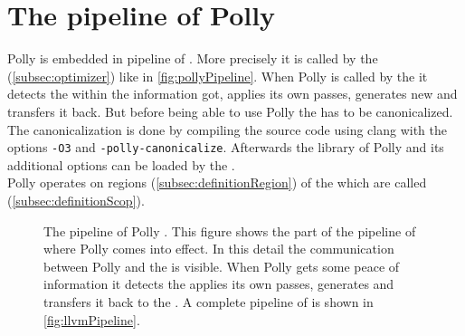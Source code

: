 \section{The pipeline of Polly}
Polly is embedded in pipeline of \llvm.
More precisely it is called by the \opt (\autoref{subsec:optimizer}) like in \autoref{fig:pollyPipeline}.
When Polly is called by the \opt it detects the \scops within the information got, applies its own passes, generates new \llvmir and transfers it back.
But before being able to use Polly the \llvmir has to be canonicalized.
The canonicalization is done by compiling the source code using clang with the options \texttt{-O3} and \texttt{-polly-canonicalize}.
Afterwards the library of Polly and its additional options can be loaded by the \opt.\\
Polly operates on regions (\autoref{subsec:definitionRegion}) of the \cfg which are called \scops (\autoref{subsec:definitionScop}).
\begin{figure}[H]
    \caption[The pipeline of Polly]{
        The pipeline of Polly \cite{PollyPresentation}.
        This figure shows the part of the pipeline of \llvm where Polly comes into effect.
        In this detail the communication between Polly and the \opt is visible.
        When Polly gets some peace of information it detects the \scops applies its own passes, generates \llvmir and transfers it back to the \opt.
        A complete pipeline of \llvm is shown in \autoref{fig:llvmPipeline}.\tikzlegend
    }
    \centering
    \label{fig:pollyPipeline}
\end{figure}
